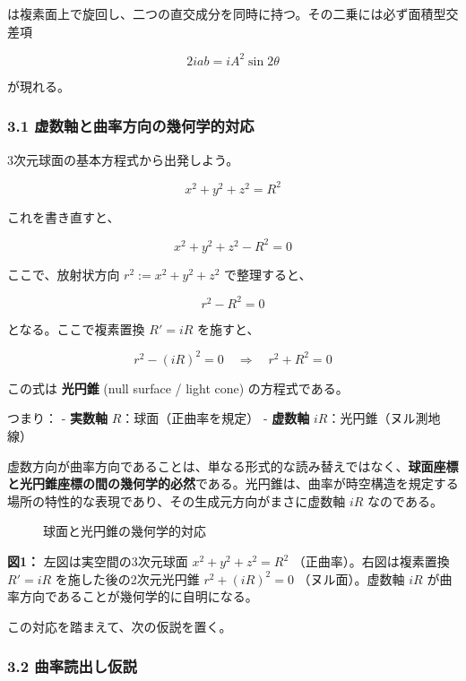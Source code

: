 \documentclass[
  a4paper,
]{ltjsarticle}
\makeatletter
\newcommand*\pandocbounded[1]{%
  \sbox\pandoc@box{#1}%
  \Gscale@div\@tempa{\textheight}{\dimexpr\ht\pandoc@box+\dp\pandoc@box\relax}%
  \Gscale@div\@tempb{\linewidth}{\wd\pandoc@box}%
  \ifdim\@tempb\p@<\@tempa\p@\let\@tempa\@tempb\fi%
  \ifdim\@tempa\p@<\p@\scalebox{\@tempa}{\usebox\pandoc@box}%
  \else\usebox{\pandoc@box}%
  \fi%
}
\makeatother
\begin{document}
は複素面上で旋回し、二つの直交成分を同時に持つ。その二乗には必ず面積型交差項

\[2iab=iA^2\sin2\theta\]

が現れる。

\subsubsection{3.1
虚数軸と曲率方向の幾何学的対応}\label{ux865aux6570ux8ef8ux3068ux66f2ux7387ux65b9ux5411ux306eux5e7eux4f55ux5b66ux7684ux5bfeux5fdc}

3次元球面の基本方程式から出発しよう。

\[x^2 + y^2 + z^2 = R^2\]

これを書き直すと、

\[x^2 + y^2 + z^2 - R^2 = 0\]

ここで、放射状方向 \(r^2 := x^2 + y^2 + z^2\) で整理すると、

\[r^2 - R^2 = 0\]

となる。ここで複素置換 \(R' = iR\) を施すと、

\[r^2 - (iR)^2 = 0 \quad \Rightarrow \quad r^2 + R^2 = 0\]

この式は \textbf{光円錐} (null surface / light cone) の方程式である。

つまり： - \textbf{実数軸} \(R\)：球面（正曲率を規定） - \textbf{虚数軸}
\(iR\)：光円錐（ヌル測地線）

虚数方向が曲率方向であることは、単なる形式的な読み替えではなく、\textbf{球面座標と光円錐座標の間の幾何学的必然}である。光円錐は、曲率が時空構造を規定する場所の特性的な表現であり、その生成元方向がまさに虚数軸
\(iR\) なのである。

\begin{figure}
\centering
\pandocbounded{}
\caption{球面と光円錐の幾何学的対応}
\end{figure}

\textbf{図1：} 左図は実空間の3次元球面 \(x^2 + y^2 + z^2 = R^2\)
（正曲率）。右図は複素置換 \(R' = iR\) を施した後の2次元光円錐
\(r^2 + (iR)^2 = 0\) （ヌル面）。虚数軸 \(iR\)
が曲率方向であることが幾何学的に自明になる。

この対応を踏まえて、次の仮説を置く。

\subsubsection{3.2
曲率読出し仮説}\label{ux66f2ux7387ux8aadux51faux3057ux4eeeux8aac}
\end{document}
